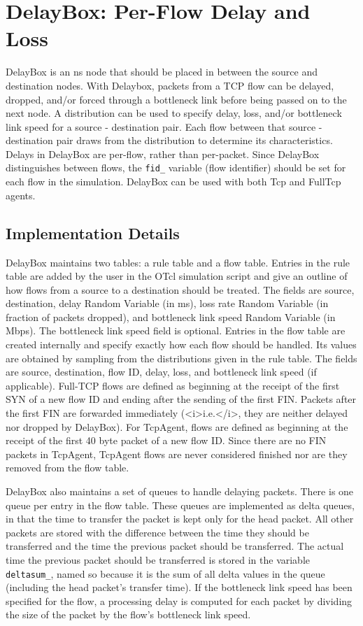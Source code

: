 \chapter{DelayBox: Per-Flow Delay and Loss}
\label{chap:delaybox}

DelayBox is an ns node that should be placed in between the source and
destination nodes. With Delaybox, packets from a TCP flow can be
delayed, dropped, and/or forced through a bottleneck link before being
passed on to the next node. A distribution can be used to specify
delay, loss, and/or bottleneck link speed for a source - destination
pair.  Each flow between that source - destination pair draws from the
distribution to determine its characteristics. Delays in DelayBox are
per-flow, rather than per-packet. Since DelayBox distinguishes between
flows, the {\tt fid\_} variable (flow identifier) should be set for
each flow in the simulation.  DelayBox can be used with both Tcp and
FullTcp agents.


\section{Implementation Details}

DelayBox maintains two tables: a rule table and a flow table.  Entries
in the rule table are added by the user in the OTcl simulation script
and give an outline of how flows from a source to a destination should
be treated.  The fields are source, destination, delay Random Variable
(in ms), loss rate Random Variable (in fraction of packets dropped),
and bottleneck link speed Random Variable (in Mbps).  The bottleneck
link speed field is optional.  Entries in the flow table are created
internally and specify exactly how each flow should be handled.  Its
values are obtained by sampling from the distributions given in the
rule table.  The fields are source, destination, flow ID, delay, loss,
and bottleneck link speed (if applicable).  Full-TCP flows are defined
as beginning at the receipt of the first SYN of a new flow ID and
ending after the sending of the first FIN.  Packets after the first
FIN are forwarded immediately (<i>i.e.</i>, they are neither delayed
nor dropped by DelayBox). For TcpAgent, flows are defined as beginning
at the receipt of the first 40 byte packet of a new flow ID.  Since
there are no FIN packets in TcpAgent, TcpAgent flows are never
considered finished nor are they removed from the flow table.

DelayBox also maintains a set of queues to handle delaying packets.
There is one queue per entry in the flow table.  These queues are
implemented as delta queues, in that the time to transfer the packet
is kept only for the head packet.  All other packets are stored with
the difference between the time they should be transferred and the
time the previous packet should be transferred.  The actual time the
previous packet should be transferred is stored in the variable {\tt
  deltasum\_}, named so because it is the sum of all delta values in
the queue (including the head packet's transfer time).  If the
bottleneck link speed has been specified for the flow, a processing
delay is computed for each packet by dividing the size of the packet
by the flow's bottleneck link speed.


